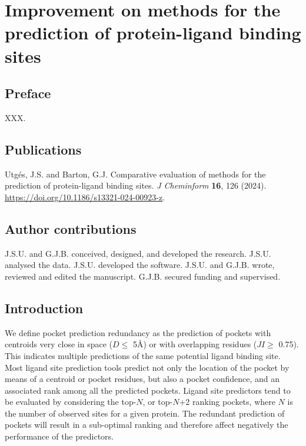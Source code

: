 \chapter{Improvement on methods for the prediction of protein-ligand binding sites}

\section*{Preface}

XXX.

\section*{Publications}

Utgés, J.S. and Barton, G.J. Comparative evaluation of methods for the prediction of protein-ligand binding sites. \textit{J Cheminform} \textbf{16}, 126 (2024). \url{https://doi.org/10.1186/s13321-024-00923-z}. \cite{UTGES_2024_LBSCOMP}

\section*{Author contributions}

J.S.U. and G.J.B. conceived, designed, and developed the research. J.S.U. analysed the data. J.S.U. developed the software. J.S.U. and G.J.B. wrote, reviewed and edited the manuscript. G.J.B. secured funding and supervised.

\section{Introduction}


We define pocket prediction redundancy as the prediction of pockets with centroids very close in space ($D \leq$ 5\AA{}) or with overlapping residues ($JI \geq$ 0.75). This indicates multiple predictions of the same potential ligand binding site. Most ligand site prediction tools predict not only the location of the pocket by means of a centroid or pocket residues, but also a pocket confidence, and an associated rank among all the predicted pockets. Ligand site predictors tend to be evaluated by considering the top-$N$, or top-$N$+2 ranking pockets, where $N$ is the number of observed sites for a given protein. The redundant prediction of pockets will result in a sub-optimal ranking and therefore affect negatively the performance of the predictors.

